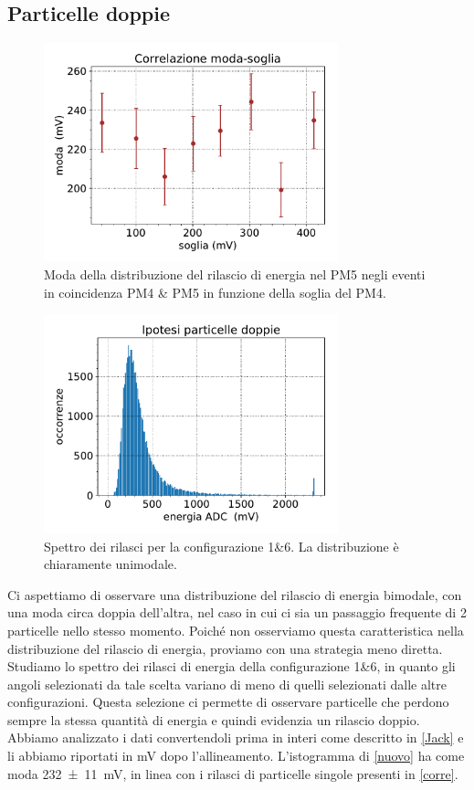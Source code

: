 \subsection{Particelle doppie}

\begin{figure}
	\centering
	\includegraphics[width=23em]{doppie}
	\caption{Moda della distribuzione del rilascio di energia nel PM5
	negli eventi in coincidenza PM4 \& PM5
	in funzione della soglia del PM4.}
	\label{corre}
\end{figure}

\begin{figure}
	\centering
	\includegraphics[width=23em]{nuovo}
	\caption{Spettro dei rilasci per la configurazione 1\&6. La distribuzione è chiaramente unimodale.}
	\label{nuovo}
\end{figure}

Ci aspettiamo di osservare una distribuzione del rilascio di energia bimodale,
con una moda circa doppia dell'altra,
nel caso in cui ci sia un passaggio frequente di 2 particelle nello stesso momento.
Poiché non osserviamo questa caratteristica nella distribuzione del rilascio di energia,
proviamo con una strategia meno diretta.
Studiamo lo spettro dei rilasci di energia della configurazione 1\&6, in quanto gli angoli selezionati da tale scelta variano di meno di quelli selezionati dalle altre configurazioni. Questa selezione ci permette di osservare particelle che perdono sempre la stessa quantità di energia e quindi evidenzia un rilascio doppio.
Abbiamo analizzato i dati convertendoli prima in interi come descritto in \autoref{Jack} e li abbiamo riportati in \si{mV} dopo l'allineamento.
L'istogramma di \autoref{nuovo} ha come moda \SI{232\pm11}{mV}, in linea con i rilasci di particelle singole presenti in \autoref{corre}. 

